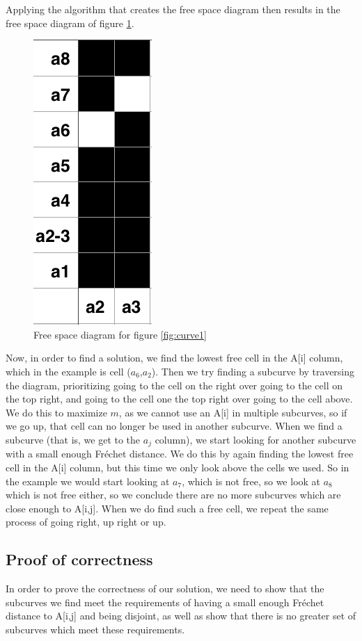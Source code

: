 \documentclass[a4paper,11pt]{article}
\begin{document}
Applying the algorithm that creates the free space diagram then results in the free space diagram of figure \ref{fig:freespace}.

\begin{figure}[H]
	\centering
	\includegraphics[scale=0.8]{freespace}
	\caption{Free space diagram for figure \ref{fig:curve1}}
	\label{fig:freespace}
\end{figure}

Now, in order to find a solution, we find the lowest free cell in the A[i] column, which in the example is cell ($a_6$,$a_2$). Then we try finding a subcurve by traversing the diagram, prioritizing going to the cell on the right over going to the cell on the top right, and going to the cell one the top right over going to the cell above. We do this to maximize $m$, as we cannot use an A[i] in multiple subcurves, so if we go up, that cell can no longer be used in another subcurve. When we find a subcurve (that is, we get to the $a_j$ column), we start looking for another subcurve with a small enough Fr\'{e}chet distance. We do this by again finding the lowest free cell in the A[i] column, but this time we only look above the cells we used. So in the example we would start looking at $a_7$, which is not free, so we look at $a_8$ which is not free either, so we conclude there are no more subcurves which are close enough to A[i,j]. When we do find such a free cell, we repeat the same process of going right, up right or up.

\subsection*{Proof of correctness}
In order to prove the correctness of our solution, we need to show that the subcurves we find meet the requirements of having a small enough Fr\'{e}chet distance to A[i,j] and being disjoint, as well as show that there is no greater set of subcurves which meet these requirements.\\
\end{document}
